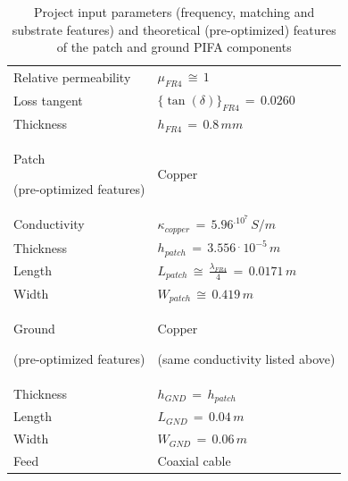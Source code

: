 \documentclass[10pt,a4paper,twocolumn]{article}
\begin{document}
{\begin{table}[b!]
\begin{center}
{\begin{tabular}{||m{4.2cm}|m{4.2cm}||}
				Relative permeability & $\mu_{FR4}\,\cong\,1$\\
				
				Loss tangent & $\{\tan(\delta)\}_{FR4}\,=\,0.0260$\\
				
				Thickness & $h_{FR4}\,=\,0.8\,mm$\\
				\hline
				\cellcolor{pink} Patch
				
				(pre-optimized features) & \cellcolor{pink} Copper \\
				\hline
			Conductivity & $\kappa_{copper}\,=\,5.96^.10^7\,S/m$ \\
			
			Thickness & $h_{patch}\,=\,3.556\,^.\,10^{-5}\,m$\\
			
			Length & $L_{patch}\,\cong\,\frac{\lambda_{FR4}}{4}\,=\,0.0171\,m$\\
			
			Width & $W_{patch}\,\cong\,0.419\,m$\\
			
			\hline
			\cellcolor{pink}Ground 
			
			(pre-optimized features)
			& \cellcolor{pink} Copper
			
			(same conductivity listed above) \\
			\hline
			Thickness & $h_{GND}\,=\,h_{patch}$
			\\
			Length & $L_{GND}\,=\,0.04\,m$\\
			Width & $W_{GND}\,=\,0.06\,m$\\
			\hline
			\cellcolor{pink}Feed & \cellcolor{pink} Coaxial cable \\
			\hline
	\end{tabular}}
	\caption{Project input parameters (frequency, matching and substrate features) and theoretical (pre-optimized) features of the patch and ground PIFA components}
	\label{table:pifa design parameters}
\end{center}

\end{table}

}
\end{document}
